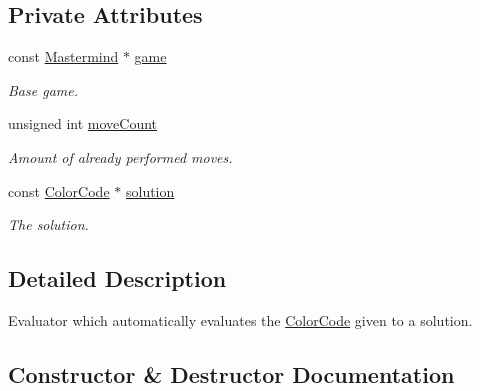 \subsection*{Private Attributes}
\begin{DoxyCompactItemize}
\item 
const \hyperlink{classmastermind_1_1logic_1_1_mastermind}{Mastermind} $\ast$ \hyperlink{classmastermind_1_1logic_1_1_computer_evaluator_a8801ded4db90b5feae19e6d521738311}{game}
\begin{DoxyCompactList}\small\item\em Base game. \end{DoxyCompactList}\item 
unsigned int \hyperlink{classmastermind_1_1logic_1_1_computer_evaluator_afc73806d239bdc6c9df603850d309982}{move\+Count}
\begin{DoxyCompactList}\small\item\em Amount of already performed moves. \end{DoxyCompactList}\item 
const \hyperlink{classmastermind_1_1logic_1_1_color_code}{Color\+Code} $\ast$ \hyperlink{classmastermind_1_1logic_1_1_computer_evaluator_a8bd8017a92e245a8985f2caf71b45c44}{solution}
\begin{DoxyCompactList}\small\item\em The solution. \end{DoxyCompactList}\end{DoxyCompactItemize}


\subsection{Detailed Description}
Evaluator which automatically evaluates the \hyperlink{classmastermind_1_1logic_1_1_color_code}{Color\+Code} given to a solution. 

\subsection{Constructor \& Destructor Documentation}
\hypertarget{classmastermind_1_1logic_1_1_computer_evaluator_add62379f02e99740075dadc62f9707c9}{}\label{classmastermind_1_1logic_1_1_computer_evaluator_add62379f02e99740075dadc62f9707c9} 
